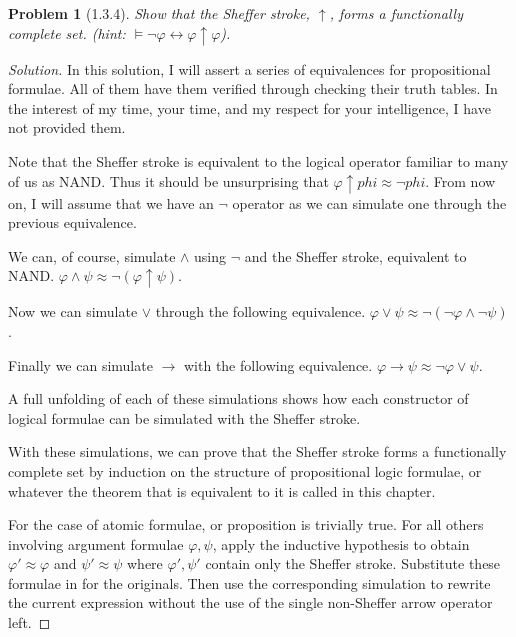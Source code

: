 \documentclass[letter]{article}
\newtheorem{problem}{Problem}
\theoremstyle{definition}
\newenvironment{solution}
{\begin{proof}[Solution]}
        {\end{proof}}
\renewcommand{\phi}{\varphi}
\begin{document}
\begin{problem}[1.3.4] Show that the Sheffer stroke, $\uparrow$, forms a functionally complete set. (hint: $\models \neg \phi \leftrightarrow \phi \uparrow \phi$).
\end{problem}
\begin{solution}
  In this solution, I will assert a series of equivalences for propositional formulae. All of them have them verified through checking their truth tables. In the interest of my time, your time, and my respect for your intelligence, I have not provided them.

  Note that the Sheffer stroke is equivalent to the logical operator familiar to many of us as NAND. Thus it should be unsurprising that $\phi \uparrow phi \approx \lnot phi$. From now on, I will assume that we have an $\lnot$ operator as we can simulate one through the previous equivalence.

  We can, of course, simulate $\land$ using $\lnot$ and the Sheffer stroke, equivalent to NAND. $\phi \land \psi \approx \lnot (\phi \uparrow \psi)$.

  Now we can simulate $\lor$ through the following equivalence. $\phi \lor \psi \approx \lnot (\lnot \phi \land \lnot \psi)$.

  Finally we can simulate $\to$ with the following equivalence. $\phi \to \psi \approx \lnot \phi \lor \psi$.

  A full unfolding of each of these simulations shows how each constructor of logical formulae can be simulated with the Sheffer stroke.

  With these simulations, we can prove that the Sheffer stroke forms a functionally complete set by induction on the structure of propositional logic formulae, or whatever the theorem that is equivalent to it is called in this chapter.

  For the case of atomic formulae, or proposition is trivially true. For all others involving argument formulae $\phi,\psi$, apply the inductive hypothesis to obtain $\phi'\approx \phi$ and $\psi' \approx \psi$ where $\phi',\psi'$ contain only the Sheffer stroke. Substitute these formulae in for the originals. Then use the corresponding simulation to rewrite the current expression without the use of the single non-Sheffer arrow operator left.
\end{solution}
\end{document}
